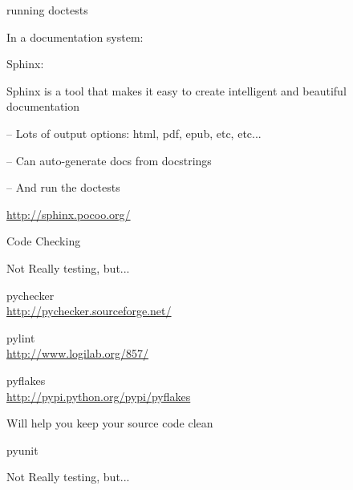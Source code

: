 \documentclass{beamer}
\begin{document}
\begin{frame}[fragile]{running doctests}

\vfill
{\large In an external file:

\begin{verbatim}
    doctest.testmfile("name_of_test_file.txt")
\end{verbatim}

{\large Tests the docs in the file (reSt format...) }


\vfill
{\large With a test runner: more on that later}


\vfill
\url{http://sphinx.pocoo.org/}
\end{frame} 

\begin{frame}[fragile]{running doctests}

\vfill
{\large In a documentation system:}

\vfill
{\LARGE Sphinx:}

\vfill
{\Large Sphinx is a tool that makes it easy to create intelligent and beautiful documentation}

\vfill
{\Large -- Lots of output options: html, pdf, epub, etc, etc...}

\vfill
{\Large -- Can auto-generate docs from docstrings}

\vfill
{\Large -- And run the doctests}

\vfill
\url{http://sphinx.pocoo.org/}
\end{frame} 

\begin{frame}[fragile]{Code Checking}

{\LARGE Not Really testing, but...}

\vfill
{\LARGE pychecker}\\
\url{http://pychecker.sourceforge.net/}

\vfill
{\LARGE pylint}\\
\url{http://www.logilab.org/857/}

\vfill
{\LARGE pyflakes}\\
\url{http://pypi.python.org/pypi/pyflakes}

\vfill
{\Large Will help you keep your source code clean}

\end{frame} 

\begin{frame}[fragile]{pyunit}

{\LARGE Not Really testing, but...}

\end{frame} 
\end{document}
